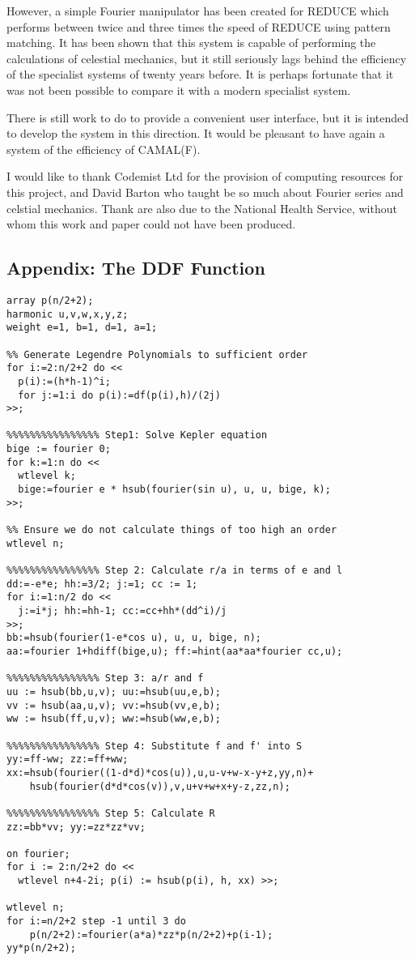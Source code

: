 However, a simple Fourier manipulator has been created for REDUCE which
performs between twice and three times the speed of REDUCE using
pattern matching.  It has been shown that this system is capable of
performing the calculations of celestial mechanics, but it still
seriously lags behind the efficiency of the specialist systems of
twenty years before.  It is perhaps fortunate that it was not been
possible to compare it with a modern specialist system.

There is still work to do to provide a convenient user interface, but
it is intended to develop the system in this direction.  It would be
pleasant to have again a system of the efficiency of CAMAL(F).

I would like to thank Codemist Ltd for the provision of computing
resources for this project, and David Barton who taught be so much
about Fourier series and celstial mechanics.  Thank are also due to
the National Health Service, without whom this work and paper could not
have been produced.

\subsection*{Appendix: The DDF Function}
\begin{verbatim}
array p(n/2+2);
harmonic u,v,w,x,y,z;
weight e=1, b=1, d=1, a=1;

%% Generate Legendre Polynomials to sufficient order
for i:=2:n/2+2 do <<
  p(i):=(h*h-1)^i;
  for j:=1:i do p(i):=df(p(i),h)/(2j)
>>;

%%%%%%%%%%%%%%%% Step1: Solve Kepler equation
bige := fourier 0;
for k:=1:n do <<
  wtlevel k;
  bige:=fourier e * hsub(fourier(sin u), u, u, bige, k);
>>;

%% Ensure we do not calculate things of too high an order
wtlevel n;

%%%%%%%%%%%%%%%% Step 2: Calculate r/a in terms of e and l
dd:=-e*e; hh:=3/2; j:=1; cc := 1;
for i:=1:n/2 do <<
  j:=i*j; hh:=hh-1; cc:=cc+hh*(dd^i)/j
>>;
bb:=hsub(fourier(1-e*cos u), u, u, bige, n);
aa:=fourier 1+hdiff(bige,u); ff:=hint(aa*aa*fourier cc,u);

%%%%%%%%%%%%%%%% Step 3: a/r and f
uu := hsub(bb,u,v); uu:=hsub(uu,e,b);
vv := hsub(aa,u,v); vv:=hsub(vv,e,b);
ww := hsub(ff,u,v); ww:=hsub(ww,e,b);

%%%%%%%%%%%%%%%% Step 4: Substitute f and f' into S
yy:=ff-ww; zz:=ff+ww;
xx:=hsub(fourier((1-d*d)*cos(u)),u,u-v+w-x-y+z,yy,n)+
    hsub(fourier(d*d*cos(v)),v,u+v+w+x+y-z,zz,n);

%%%%%%%%%%%%%%%% Step 5: Calculate R
zz:=bb*vv; yy:=zz*zz*vv;

on fourier;
for i := 2:n/2+2 do <<
  wtlevel n+4-2i; p(i) := hsub(p(i), h, xx) >>;

wtlevel n;
for i:=n/2+2 step -1 until 3 do
    p(n/2+2):=fourier(a*a)*zz*p(n/2+2)+p(i-1);
yy*p(n/2+2);
\end{verbatim}
